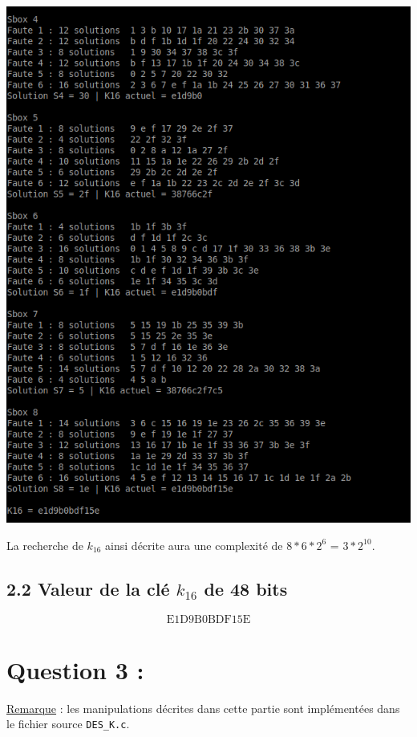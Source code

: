 			\begin{center}\includegraphics[scale=0.8]{K16.png}\end{center}
			
			La recherche de $k_{16}$ ainsi décrite aura une complexité de $8 * 6 * 2^{6}$ = $3 * 2^{10}$.
			
		\subsection*{2.2 Valeur de la clé $k_{16}$ de 48 bits}
		\[ \textrm{E1D9B0BDF15E} \]
		
	\section*{Question 3 :}
		
		\noindent \underline{Remarque} : les manipulations décrites dans cette partie sont implémentées dans le fichier source \lstinline!DES_K.c!.
		
